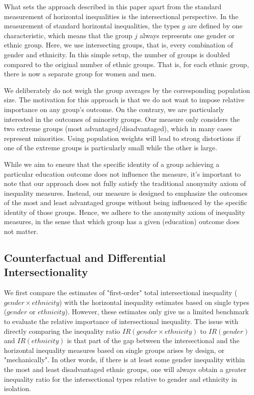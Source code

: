 What sets the approach described in this paper apart from the standard measurement of horizontal inequalities is the intersectional perspective. In the measurement of standard horizontal inequalities, the types $g$ are defined by one characteristic, which means that the group $j$ always represents one gender or ethnic group. Here, we use intersecting groups, that is, every combination of gender and ethnicity. In this simple setup, the number of groups is doubled compared to the original number of ethnic groups. That is, for each ethnic group, there is now a separate group for women and men.

We deliberately do not weigh the group averages by the corresponding population size. The motivation for this approach is that we do not want to impose relative importance on any group's outcome. On the contrary, we are particularly interested in the outcomes of minority groups. Our measure only considers the two extreme groups (most advantaged/disadvantaged), which in many cases represent minorities. Using population weights will lead to strong distortions if one of the extreme groups is particularly small while the other is large. 

While we aim to ensure that the specific identity of a group achieving a particular education outcome does not influence the measure, it's important to note that our approach does not fully satisfy the traditional anonymity axiom of inequality measures. Instead, our measure is designed to emphasize the outcomes of the most and least advantaged groups without being influenced by the specific identity of those groups. Hence, we adhere to the anonymity axiom of inequality measures, in the sense that which group has a given (education) outcome does not matter. 

\hypertarget{counterfactual-and-differential-intersectionality.}{%
\subsection{Counterfactual and Differential Intersectionality}\label{counterfactual-and-differential.}}

We first compare the estimates of "first-order" total intersectional inequality ($gender \times ethnicity$) with the horizontal inequality estimates based on single types ($gender$ or $ethnicity$). However, these estimates only give us a limited benchmark to evaluate the relative importance of intersectional inequality. The issue with directly comparing the inequality ratio $IR(gender \times ethnicity)$ to $IR(gender)$ and $IR(ethnicity)$ is that part of the gap between the intersectional and the horizontal inequality measures based on single groups arises by design, or "mechanically". In other words, if there is at least some gender inequality within the most and least disadvantaged ethnic groups, one will always obtain a greater inequality ratio for the intersectional types relative to gender and ethnicity in isolation.

